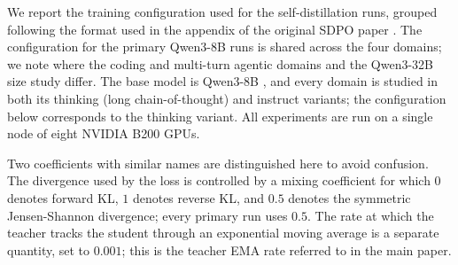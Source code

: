 \documentclass{article}
\begin{document}
We report the training configuration used for the self-distillation runs,
grouped following the format used in the appendix of the original SDPO paper
\citep{sdpo2025}. The configuration for the primary Qwen3-8B runs is shared across
the four domains; we note where the coding and multi-turn agentic domains and the
Qwen3-32B size study differ. The base model is Qwen3-8B \citep{qwen32025}, and
every domain is studied in both its thinking (long chain-of-thought) and instruct
variants; the configuration below corresponds to the thinking variant. All
experiments are run on a single node of eight NVIDIA B200 GPUs.

Two coefficients with similar names are distinguished here to avoid confusion.
The divergence used by the loss is controlled by a mixing coefficient for which
$0$ denotes forward KL, $1$ denotes reverse KL, and $0.5$ denotes the symmetric
Jensen-Shannon divergence; every primary run uses $0.5$. The rate at which the
teacher tracks the student through an exponential moving average is a separate
quantity, set to $0.001$; this is the teacher EMA rate referred to in the main
paper.
\end{document}
